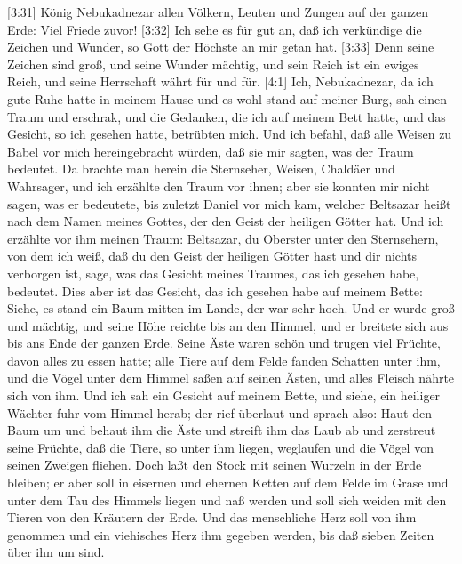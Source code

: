  {[}3:31{]} König Nebukadnezar allen Völkern, Leuten und
Zungen auf der ganzen Erde: Viel Friede zuvor!  {[}3:32{]}
Ich sehe es für gut an, daß ich verkündige die Zeichen und Wunder, so
Gott der Höchste an mir getan hat.  {[}3:33{]} Denn seine
Zeichen sind groß, und seine Wunder mächtig, und sein Reich ist ein
ewiges Reich, und seine Herrschaft währt für und für. 
{[}4:1{]} Ich, Nebukadnezar, da ich gute Ruhe hatte in meinem Hause und
es wohl stand auf meiner Burg,  sah einen Traum und
erschrak, und die Gedanken, die ich auf meinem Bett hatte, und das
Gesicht, so ich gesehen hatte, betrübten mich.  Und ich
befahl, daß alle Weisen zu Babel vor mich hereingebracht würden, daß sie
mir sagten, was der Traum bedeutet.  Da brachte man herein
die Sternseher, Weisen, Chaldäer und Wahrsager, und ich erzählte den
Traum vor ihnen; aber sie konnten mir nicht sagen, was er bedeutete,
 bis zuletzt Daniel vor mich kam, welcher Beltsazar heißt
nach dem Namen meines Gottes, der den Geist der heiligen Götter hat. Und
ich erzählte vor ihm meinen Traum:  Beltsazar, du Oberster
unter den Sternsehern, von dem ich weiß, daß du den Geist der heiligen
Götter hast und dir nichts verborgen ist, sage, was das Gesicht meines
Traumes, das ich gesehen habe, bedeutet.  Dies aber ist das
Gesicht, das ich gesehen habe auf meinem Bette: Siehe, es stand ein Baum
mitten im Lande, der war sehr hoch.  Und er wurde groß und
mächtig, und seine Höhe reichte bis an den Himmel, und er breitete sich
aus bis ans Ende der ganzen Erde.  Seine Äste waren schön
und trugen viel Früchte, davon alles zu essen hatte; alle Tiere auf dem
Felde fanden Schatten unter ihm, und die Vögel unter dem Himmel saßen
auf seinen Ästen, und alles Fleisch nährte sich von ihm. 
Und ich sah ein Gesicht auf meinem Bette, und siehe, ein heiliger
Wächter fuhr vom Himmel herab;  der rief überlaut und
sprach also: Haut den Baum um und behaut ihm die Äste und streift ihm
das Laub ab und zerstreut seine Früchte, daß die Tiere, so unter ihm
liegen, weglaufen und die Vögel von seinen Zweigen fliehen.
 Doch laßt den Stock mit seinen Wurzeln in der Erde
bleiben; er aber soll in eisernen und ehernen Ketten auf dem Felde im
Grase und unter dem Tau des Himmels liegen und naß werden und soll sich
weiden mit den Tieren von den Kräutern der Erde.  Und das
menschliche Herz soll von ihm genommen und ein viehisches Herz ihm
gegeben werden, bis daß sieben Zeiten über ihn um sind. 
